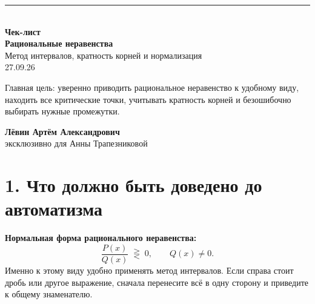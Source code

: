 \documentclass[a4paper,12pt]{article}
\begin{document}
\thispagestyle{empty}
\begin{center}
\vspace*{24mm}
{\color{accent}\rule{0.72\linewidth}{1.2pt}}\\[10mm]
{\Huge\bfseries\color{darkaccent} Чек-лист}\\[7mm]
{\LARGE\bfseries Рациональные неравенства}\\[3mm]
{\Large Метод интервалов, кратность корней и нормализация}\\[14mm]
{\large 27.09.26}\\[22mm]

\begin{minipage}{0.76\linewidth}
\centering
\large
Главная цель: уверенно приводить рациональное неравенство к удобному виду, находить все критические точки, учитывать кратность корней и безошибочно выбирать нужные промежутки.
\end{minipage}

\vfill
{\large\bfseries Лёвин Артём Александрович}\\[2mm]
{\normalsize эксклюзивно для Анны Трапезниковой}
\vspace{13mm}

\end{center}
\clearpage

\section*{1. Что должно быть доведено до автоматизма}

\textbf{Нормальная форма рационального неравенства:}
\[
\frac{P(x)}{Q(x)}\;\gtreqless\;0, \qquad Q(x)\ne0.
\]
Именно к этому виду удобно применять метод интервалов. Если справа стоит дробь или другое выражение, сначала перенесите всё в одну сторону и приведите к общему знаменателю.
\end{document}
